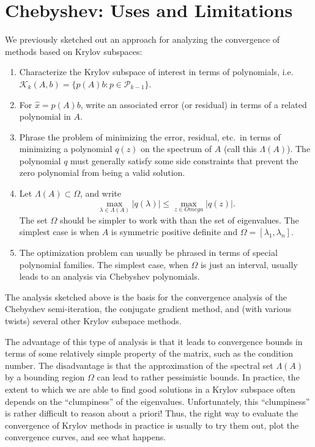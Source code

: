 \section{Chebyshev: Uses and Limitations}

We previously sketched out an approach for analyzing the convergence of
methods based on Krylov subspaces:
\begin{enumerate}
\item
  Characterize the Krylov subspace of interest in terms of polynomials,
  i.e. $\mathcal{K}_k(A,b) = \{ p(A)b : p \in \mathcal{P}_{k-1} \}$.
\item
  For $\hat{x} = p(A) b$, write an associated error (or residual)
  in terms of a related polynomial in $A$.
\item
  Phrase the problem of minimizing the error, residual, etc.~in terms
  of minimizing a polynomial $q(z)$ on the spectrum of $A$
  (call this $\Lambda(A)$).  The polynomial $q$ must generally satisfy
  some side constraints that prevent the zero polynomial from being
  a valid solution.
\item
  Let $\Lambda(A) \subset \Omega$, and write
  \[
    \max_{\lambda \in \Lambda(A)} |q(\lambda)| \leq
    \max_{z \in Omega} |q(z)|.
  \]
  The set $\Omega$ should be simpler to work with than the set of
  eigenvalues.  The simplest case is when $A$ is symmetric positive
  definite and $\Omega = [\lambda_1, \lambda_n]$.
\item
  The optimization problem can usually be phrased in terms of special
  polynomial families.  The simplest case, when $\Omega$ is just an
  interval, usually leads to an analysis via Chebyshev polynomials.
\end{enumerate}
The analysis sketched above is the basis for the convergence analysis
of the Chebyshev semi-iteration, the conjugate gradient method, and
(with various twists) several other Krylov subspace methods.

The advantage of this type of analysis is that it leads to convergence
bounds in terms of some relatively simple property of the matrix, such
as the condition number.  The disadvantage is that the approximation of
the spectral set $\Lambda(A)$ by a bounding region $\Omega$ can lead to
rather pessimistic bounds.  In practice, the extent to which we are able
to find good solutions in a Krylov subspace often depends on the
``clumpiness'' of the eigenvalues.  Unfortunately, this ``clumpiness''
is rather difficult to reason about a priori!  Thus, the right way to evaluate
the convergence of Krylov methods in practice is usually to try them out,
plot the convergence curves, and see what happens.
